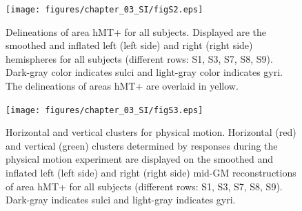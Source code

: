 \begin{figure}[htbp!]
\captionsetup{labelformat=empty}
\centering
\texttt{[image: figures/chapter\_03\_SI/figS2.eps]}
\caption{}
\end{figure}

\begin{figure}[ht!]
\ContinuedFloat
\captionsetup{labelformat=adja-page}
\caption{Delineations of area hMT+ for all subjects. Displayed are the smoothed and inflated left (left side) and right (right side) hemispheres for all subjects (different rows: S1, S3, S7, S8, S9). Dark-gray color indicates sulci and light-gray color indicates gyri. The delineations of areas hMT+ are overlaid in yellow.}
\label{fig:figE_MtLoc}
\noindent\hrulefill
\end{figure}

\begin{figure}[htbp!]
\captionsetup{labelformat=empty}
\centering
\texttt{[image: figures/chapter\_03\_SI/figS3.eps]}
\caption{}
\end{figure}

\begin{figure}[ht!]
\ContinuedFloat
\captionsetup{labelformat=adja-page}
\caption{Horizontal and vertical clusters for physical motion. Horizontal (red) and vertical (green) clusters determined by responses during the physical motion experiment are displayed on the smoothed and inflated left (left side) and right (right side) mid-GM reconstructions of area hMT+ for all subjects (different rows: S1, S3, S7, S8, S9). Dark-gray indicates sulci and light-gray indicates gyri.}
\label{fig:figG_clusters}
\noindent\hrulefill
\end{figure}

